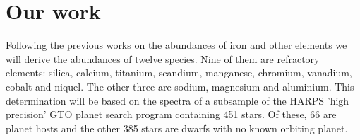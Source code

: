 \documentclass[dvips,12pt,a4paper]{report}
\begin{document}
{%






\section {Our work}


Following the previous works on the abundances of iron and other elements we will derive the abundances of twelve species. Nine of them are refractory elements: silica, calcium, titanium, scandium, manganese, chromium, vanadium, cobalt and niquel. The other three are sodium, magnesium and aluminium. This determination will be based on the spectra of a subsample of the HARPS 'high precision' GTO planet search program containing 451 stars. Of these, 66 are planet hosts and the other 385 stars are dwarfs with no known orbiting planet. 

}
\end{document}
